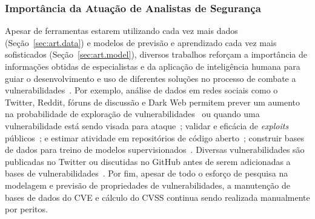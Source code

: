 \subsubsection{Importância da Atuação de Analistas de Segurança}

Apesar de ferramentas estarem utilizando cada vez mais dados (Seção~\ref{sec:art.data}) e modelos de previsão e aprendizado cada vez mais sofisticados (Seção~\ref{sec:art.model}), diversos trabalhos reforçam a importância de informações obtidas de especialistas e da aplicação de inteligência humana  para guiar o desenvolvimento e uso de diferentes soluções no processo de combate a vulnerabilidades~\cite{votipka18vuln}.
Por exemplo, análise de dados em redes sociais como o Twitter, Reddit, fóruns de discussão e Dark Web permitem prever um aumento na probabilidade de exploração de vulnerabilidades~\cite{sabottke2015vulnerability} ou quando uma vulnerabilidade está sendo visada para ataque~\cite{chen2019using, nunes16darknet}; validar e eficácia de \emph{exploits} públicos~\cite{suciu22exploitability}; e estimar atividade em repositórios de código aberto~\cite{sameera19social}; construir bases de dados para treino de modelos supervisionados~\cite{wu22dataquality}. Diversas vulnerabilidades são publicadas no Twitter ou discutidas no GitHub antes de serem adicionadas a bases de vulnerabilidades~\cite{le22github, chen19vase, sabottke2015vulnerability}. Por fim, apesar de todo o esforço de pesquisa na modelagem e previsão de propriedades de vulnerabilidades, a manutenção de bases de dados do CVE e cálculo do CVSS continua sendo realizada manualmente por peritos.


